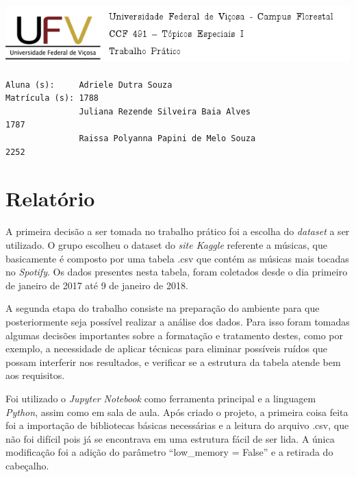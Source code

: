 \documentclass[11pt]{article}
\title{ }
\makeatletter
\def\maxwidth{\ifdim\Gin@nat@width>\linewidth\linewidth
    \else\Gin@nat@width\fi}
\let\Oldincludegraphics\includegraphics
\renewcommand{\includegraphics}[1]{\Oldincludegraphics[width=.8\maxwidth]{#1}}
\makeatother
\begin{document}
    
    
    \maketitle
    
    

    
    \subsection{\texorpdfstring{\protect\includegraphics{logo.png}}{}}\label{section}

    \begin{verbatim}
Aluna (s):     Adriele Dutra Souza                             Matrícula (s): 1788
               Juliana Rezende Silveira Baia Alves                            1787
               Raissa Polyanna Papini de Melo Souza                           2252 
\end{verbatim}

    \section{Relatório}\label{relatuxf3rio}

A primeira decisão a ser tomada no trabalho prático foi a escolha do
\emph{dataset} a ser utilizado. O grupo escolheu o dataset do \emph{site
Kaggle} referente a músicas, que basicamente é composto por uma tabela
.csv que contém as músicas mais tocadas no \emph{Spotify}. Os dados
presentes nesta tabela, foram coletados desde o dia primeiro de janeiro
de 2017 até 9 de janeiro de 2018.

A segunda etapa do trabalho consiste na preparação do ambiente para que
posteriormente seja possível realizar a análise dos dados. Para isso
foram tomadas algumas decisões importantes sobre a formatação e
tratamento destes, como por exemplo, a necessidade de aplicar técnicas
para eliminar possíveis ruídos que possam interferir nos resultados, e
verificar se a estrutura da tabela atende bem aos requisitos.

Foi utilizado o \emph{Jupyter Notebook} como ferramenta principal e a
linguagem \emph{Python}, assim como em sala de aula. Após criado o
projeto, a primeira coisa feita foi a importação de bibliotecas básicas
necessárias e a leitura do arquivo .csv, que não foi difícil pois já se
encontrava em uma estrutura fácil de ser lida. A única modificação foi a
adição do parâmetro ``low\_memory = False'' e a retirada do cabeçalho.
\end{document}
